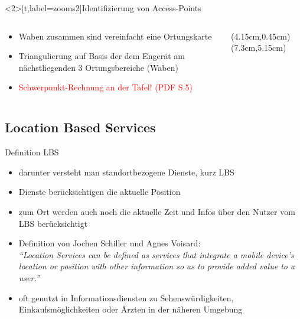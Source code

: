 \begin{frame}<2>[t,label=zooms2]{Identifizierung von Access-Points}
  \begin{columns}
  \begin{column}{.4\textwidth}
  \begin{itemize}
  \item Waben zusammen sind vereinfacht eine Ortungskarte
  \item Triangulierung auf Basis der dem Engerät am nächstliegenden 3 Ortungsbereiche (Waben)
  \item \textcolor{red}{Schwerpunkt-Rechnung an der Tafel! (PDF S.5)}
  \end{itemize}
  \end{column}
  \begin{column}{.5\textwidth}
  \begin{center}
  (4.15cm,0.45cm)(7.3cm,5.15cm)
  \end{center}
  \end{column}
  \end{columns}
\end{frame}

\subsection{Location Based Services}
\begin{frame}{Definition LBS}
\begin{itemize}
  \item darunter versteht man standortbezogene Dienste, kurz LBS
  \item Dienste berücksichtigen die aktuelle Position
  \item zum Ort werden auch noch die aktuelle Zeit und Infos über den Nutzer vom LBS berücksichtigt
  \item Definition von Jochen Schiller und Agnes Voisard:\\ \vspace{.5cm}
  \textit{"`Location Services can be defined as services that integrate a mobile device’s location or position with other information so as to provide added value to a user."'}
  \vspace{.5cm}
  \item oft genutzt in Informationsdiensten zu Sehenswürdigkeiten, Einkaufsmöglichkeiten oder Ärzten in der näheren Umgebung
\end{itemize}
\end{frame}

